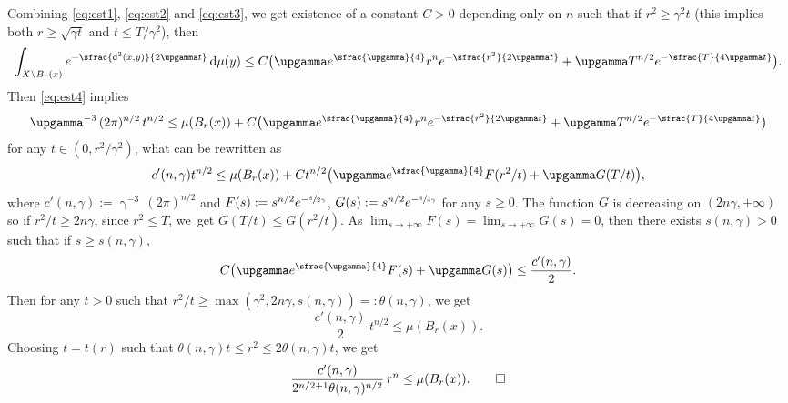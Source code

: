 \documentclass[JEP,XML,SOM,Unicode,published]{cedram}
\theoremstyle{plain}
\theoremstyle{definition}
\newcommand{\di}{\mathop{}\!\mathrm{d}}
\newcommand{\dist}{\mathsf{d}}
\begin{document}
Combining \eqref{eq:est1}, \eqref{eq:est2} and \eqref{eq:est3}, we get existence of a constant $C>0$ depending only on $n$ such that if
$r^2 \ge \gamma^2 t$ (this implies both $r\ge \sqrt{\gamma t}$ and $t \le T/\gamma^2$), then
\[
\int_{X\setminus B_r(x)} e^{-\sfrac{\dist^2(x,y)}{2\upgamma t}}\di\mu(y)\le C\bigl(\upgamma e^{\sfrac{\upgamma}{4}}r^n e^{-\sfrac{r^2}{2\upgamma t}}+\upgamma T^{n/2} e^{-\sfrac{T}{4\upgamma t}}\bigr).
\]
Then \eqref{eq:est4} implies
\begin{equation}\label{eq:lem}
\upgamma^{-3}\,(2\pi)^{n/2}\, t^{n/2} \le \mu(B_r(x))+C\bigl(\upgamma e^{\sfrac{\upgamma}{4}}r^n e^{-\sfrac{r^2}{2\upgamma t}}+\upgamma T^{n/2} e^{-\sfrac{T}{4\upgamma t}}\bigr)
\end{equation}
for any $t \in (0,r^2/\gamma^2)$, what can be rewritten as
\[
c'(n,\gamma)t^{n/2}\le \mu(B_r(x))+Ct^{n/2}\bigl(\upgamma e^{\sfrac{\upgamma}{4}} F(r^2/t)+\upgamma G(T/t)\bigr),
\]
where $c'(n,\gamma):=\upgamma^{-3}\,(2\pi)^{n/2}$ and $F(s):=s^{n/2}e^{-\sfrac{s}{2\gamma}}$, $G(s):=s^{n/2}e^{-\sfrac{s}{4\gamma}}$ for any $s\ge 0$. The function $G$ is decreasing on $(2 n\gamma,+\infty)$ so if $r^2/t \ge 2 n\gamma$, since $r^2 \le T$, we~get $G(T/t) \le G(r^2/t)$. As $\lim_{s \to +\infty}F(s)=\lim_{s \to +\infty} G(s)=0$, then there exists $s(n,\gamma)>0$ such that if $s\ge s(n,\gamma)$,
\[
C\bigl(\upgamma e^{\sfrac{\upgamma}{4}} F(s)+\upgamma G(s)\bigr) \le \frac{c'(n,\gamma)}{2}.
\]
Then for any $t >0$ such that $r^2/t \ge \max(\gamma^2,2 n\gamma,s(n,\gamma))=:\theta(n,\gamma)$, we get
\[
\frac{c'(n,\gamma)}{2}\,t^{n/2} \le \mu(B_r(x)).
\]
Choosing $t=t(r)$ such that $\theta(n,\gamma) t \le r^2 \le 2 \theta(n,\gamma)t$, we get
\[
\frac{c'(n,\gamma)}{2^{n/2+1}\theta(n,\gamma)^{n/2}}\, r^{n} \le \mu(B_r(x)).\qedhere
\]
\endproof
\end{document}
